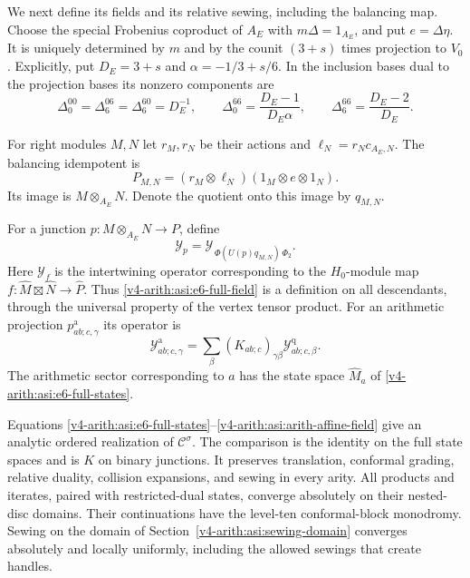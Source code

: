 We next define its fields and its relative sewing, including the
balancing map. Choose the special Frobenius coproduct of $A_E$ with
$m\Delta=1_{A_E}$, and put $e=\Delta\eta$. It is uniquely determined
by $m$ and by the counit $(3+s)$ times projection to $V_0$.
Explicitly, put $D_E=3+s$ and $\alpha=-1/3+s/6$. In the inclusion
bases dual to the projection bases its nonzero components are
\[
 \Delta_0^{00}=\Delta_6^{06}=\Delta_6^{60}=D_E^{-1},\qquad
 \Delta_0^{66}=\frac{D_E-1}{D_E\alpha},\qquad
 \Delta_6^{66}=\frac{D_E-2}{D_E}.
\]


For right modules $M,N$ let $r_M,r_N$ be their actions and
$\ell_N=r_Nc_{A_E,N}$. The balancing idempotent is
\begin{equation}\label{v4-arith:asi:balancing-idempotent}
 P_{M,N}=(r_M\otimes\ell_N)
          (1_M\otimes e\otimes1_N).
\end{equation}
Its image is $M\otimes_{A_E}N$. Denote the quotient onto this image
by $q_{M,N}$.

For a junction $p:M\otimes_{A_E}N\to P$, define
\begin{equation}\label{v4-arith:asi:e6-full-field}
 \mathcal Y_p=\mathcal Y_{\,\Phi(U(p)q_{M,N})\,\Phi_2}.
\end{equation}
Here $\mathcal Y_f$ is the intertwining operator corresponding to the
$H_0$-module map $f:\widehat M\boxtimes\widehat N\to\widehat P$.
Thus \eqref{v4-arith:asi:e6-full-field} is a definition on all descendants,
through the universal property of the vertex tensor product.
For an arithmetic projection $p^{\mathrm a}_{ab;c,\gamma}$ its operator is
\begin{equation}\label{v4-arith:asi:arith-affine-field}
 \mathcal Y^{\mathrm a}_{ab;c,\gamma}
   =\sum_\beta(K_{ab;c})_{\gamma\beta}
                       \mathcal Y^{\mathrm q}_{ab;c,\beta}.
\end{equation}
The arithmetic sector corresponding to $a$ has the state space
$\widehat M_a$ of \eqref{v4-arith:asi:e6-full-states}.

\begin{theorem}\label{v4-arith:asi:e6-analytic-comparison}
Equations \eqref{v4-arith:asi:e6-full-states}--\eqref{v4-arith:asi:arith-affine-field}
give an analytic ordered realization of $\mathcal C^\sigma$.
The comparison is the identity on the full state spaces and is $K$ on
binary junctions. It preserves translation, conformal grading, relative
duality, collision expansions, and sewing in every arity.
All products and iterates, paired with restricted-dual states,
converge absolutely on their nested-disc domains. Their continuations have the level-ten conformal-block
monodromy. Sewing on the domain of
Section~\ref{v4-arith:asi:sewing-domain} converges absolutely and
locally uniformly, including the allowed sewings that create handles.
\end{theorem}

